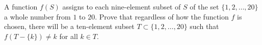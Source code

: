 A function $f(S)$ assigns to each nine-element subset of $S$ of the set $\{1,2,\ldots, 20\}$ a whole number from $1$ to $20$.  Prove that regardless of how the function $f$ is chosen, there will be a ten-element subset $T\subset\{1,2,\ldots, 20\}$ such that $f(T - \{k\})\neq k$ for all $k\in T$.